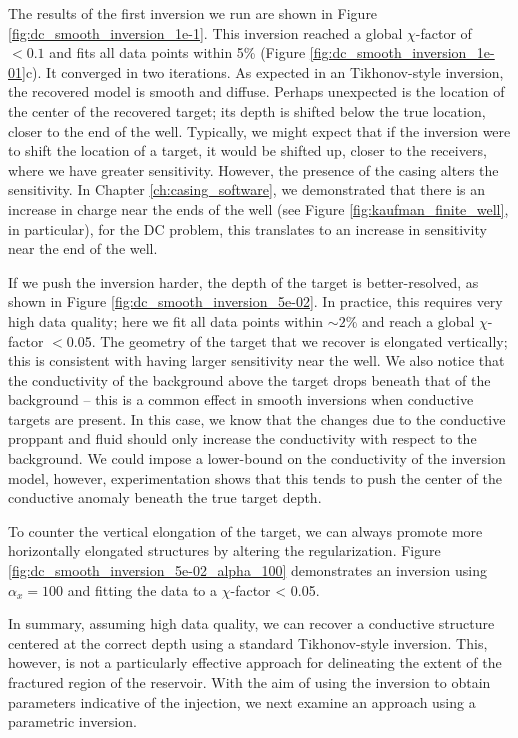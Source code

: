 The results of the first inversion we run are shown in Figure \ref{fig:dc_smooth_inversion_1e-1}. This inversion reached a global $\chi$-factor of $<0.1$ and fits all data points within 5\% (Figure \ref{fig:dc_smooth_inversion_1e-01}c). It converged in two iterations. As expected in an Tikhonov-style inversion, the recovered model is smooth and diffuse. Perhaps unexpected is the location of the center of the recovered target; its depth is shifted below the true location, closer to the end of the well. Typically, we might expect that if the inversion were to shift the location of a target, it would be shifted up, closer to the receivers, where we have greater sensitivity. However, the presence of the casing alters the sensitivity. In Chapter \ref{ch:casing_software}, we demonstrated that there is an increase in charge near the ends of the well (see Figure \ref{fig:kaufman_finite_well}, in particular), for the DC problem, this translates to an increase in sensitivity near the end of the well.






If we push the inversion harder, the depth of the target is better-resolved, as shown in Figure \ref{fig:dc_smooth_inversion_5e-02}. In practice, this requires very high data quality; here we fit all data points within $\sim2\%$ and reach a global $\chi$-factor $<$0.05. The geometry of the target that we recover is elongated vertically; this is consistent with having larger sensitivity near the well. We also notice that the conductivity of the background above the target drops beneath that of the background -- this is a common effect in smooth inversions when conductive targets are present. In this case, we know that the changes due to the conductive proppant and fluid should only increase the conductivity with respect to the background. We could impose a lower-bound on the conductivity of the inversion model, however, experimentation shows that this tends to push the center of the conductive anomaly beneath the true target depth.




To counter the vertical elongation of the target, we can always promote more horizontally elongated structures by altering the regularization. Figure \ref{fig:dc_smooth_inversion_5e-02_alpha_100} demonstrates an inversion using $\alpha_x=100$ and fitting the data to a $\chi$-factor < 0.05.



In summary, assuming high data quality, we can recover a conductive structure centered at the correct depth using a standard Tikhonov-style inversion. This, however, is not a particularly effective approach for delineating the extent of the fractured region of the reservoir. With the aim of using the inversion to obtain parameters indicative of the injection, we next examine an approach using a parametric inversion.


